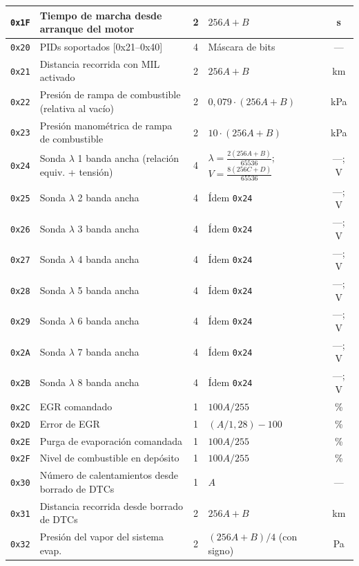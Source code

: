 {\begin{longtable}{|c|p{4.6cm}|c|p{4.4cm}|c|}
\hline
\texttt{0x1F} & Tiempo de marcha desde arranque del motor & 2 & $256A + B$ & s \\
\hline
\texttt{0x20} & PIDs soportados [0x21--0x40] & 4 & Máscara de bits & --- \\
\hline
\texttt{0x21} & Distancia recorrida con MIL activado & 2 & $256A + B$ & km \\
\hline
\texttt{0x22} & Presión de rampa de combustible (relativa al vacío) & 2 & $0{,}079 \cdot (256A + B)$ & kPa \\
\hline
\texttt{0x23} & Presión manométrica de rampa de combustible & 2 & $10 \cdot (256A + B)$ & kPa \\
\hline
\texttt{0x24} & Sonda $\lambda$ 1 banda ancha (relación equiv. + tensión) & 4 & $\lambda = \frac{2(256A+B)}{65536}$; $V = \frac{8(256C+D)}{65536}$ & ---; V \\
\hline
\texttt{0x25} & Sonda $\lambda$ 2 banda ancha & 4 & Ídem \texttt{0x24} & ---; V \\
\hline
\texttt{0x26} & Sonda $\lambda$ 3 banda ancha & 4 & Ídem \texttt{0x24} & ---; V \\
\hline
\texttt{0x27} & Sonda $\lambda$ 4 banda ancha & 4 & Ídem \texttt{0x24} & ---; V \\
\hline
\texttt{0x28} & Sonda $\lambda$ 5 banda ancha & 4 & Ídem \texttt{0x24} & ---; V \\
\hline
\texttt{0x29} & Sonda $\lambda$ 6 banda ancha & 4 & Ídem \texttt{0x24} & ---; V \\
\hline
\texttt{0x2A} & Sonda $\lambda$ 7 banda ancha & 4 & Ídem \texttt{0x24} & ---; V \\
\hline
\texttt{0x2B} & Sonda $\lambda$ 8 banda ancha & 4 & Ídem \texttt{0x24} & ---; V \\
\hline
\texttt{0x2C} & EGR comandado & 1 & $100A / 255$ & \% \\
\hline
\texttt{0x2D} & Error de EGR & 1 & $(A/1{,}28) - 100$ & \% \\
\hline
\texttt{0x2E} & Purga de evaporación comandada & 1 & $100A / 255$ & \% \\
\hline
\texttt{0x2F} & Nivel de combustible en depósito & 1 & $100A / 255$ & \% \\
\hline
\texttt{0x30} & Número de calentamientos desde borrado de DTCs & 1 & $A$ & --- \\
\hline
\texttt{0x31} & Distancia recorrida desde borrado de DTCs & 2 & $256A + B$ & km \\
\hline
\texttt{0x32} & Presión del vapor del sistema evap. & 2 & $(256A + B)/4$ (con signo) & Pa \\

\end{longtable}}
